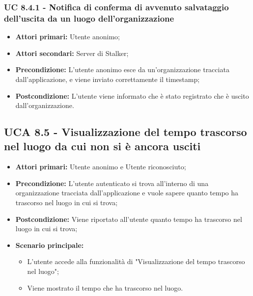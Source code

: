 \subsubsection{UC 8.4.1 - Notifica di conferma di avvenuto salvataggio dell'uscita da un luogo dell'organizzazione}%
\begin{itemize}
\item \textbf{Attori primari:} Utente anonimo;
\item \textbf{Attori secondari:} Server di Stalker;
\item \textbf{Precondizione:} L'utente anonimo esce da un'organizzazione tracciata dall'applicazione, e viene  inviato correttamente il timestamp;
\item \textbf{Postcondizione:} L'utente viene informato che è stato registrato che è uscito dall'organizzazione.
\end{itemize}

\subsection{UCA 8.5 - Visualizzazione del tempo trascorso nel luogo da cui non si è ancora usciti}%
\begin{itemize}
	\item \textbf{Attori primari:} Utente anonimo e Utente riconosciuto;
	\item \textbf{Precondizione:} L'utente autenticato si trova all'interno di una organizzazione tracciata dall'applicazione e vuole sapere quanto tempo ha trascorso nel luogo in cui si trova;
	\item \textbf{Postcondizione:} Viene riportato all'utente quanto tempo ha trascorso nel luogo in cui si trova;
	\item \textbf{Scenario principale:}
	\begin{itemize}
		\item L'utente accede alla funzionalità di "Visualizzazione del tempo trascorso nel luogo";
		\item Viene mostrato il tempo che ha trascorso nel luogo.
	\end{itemize}
\end{itemize}

